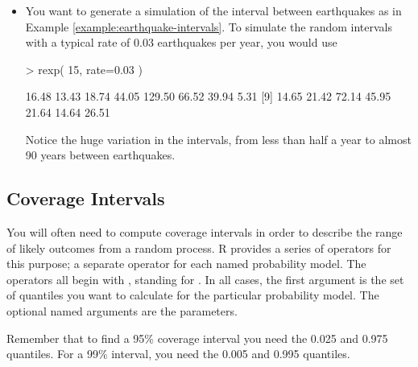 \begin{itemize}
\item You want to generate a simulation of the interval between
earthquakes as in Example \ref{example:earthquake-intervals}.  To
simulate the random intervals with a typical rate of 0.03 earthquakes
per year, you would use
\begin{Schunk}
\begin{Sinput}
> rexp( 15, rate=0.03 )
\end{Sinput}
\begin{Soutput}
 [1]  16.48  13.43  18.74  44.05 129.50  66.52  39.94   5.31
 [9]  14.65  21.42  72.14  45.95  21.64  14.64  26.51
\end{Soutput}
\end{Schunk}

Notice the huge variation in the intervals, from less than half a year
to almost 90 years between earthquakes.

\end{itemize}

\subsection{Coverage Intervals}


You will often need to compute coverage intervals in order to describe 
the range of likely outcomes from a random process.  R provides a
series of operators for this purpose; a separate operator for each
named probability model.  The operators all begin with ,
standing for .  In all cases, the first argument is
the set of quantiles you want to calculate for the particular
probability model.  The optional named arguments are the parameters.

Remember
that to find a 95\% coverage interval you need the 0.025 and 0.975
quantiles.  For a 99\% interval, you need the 0.005 and 0.995
quantiles.


